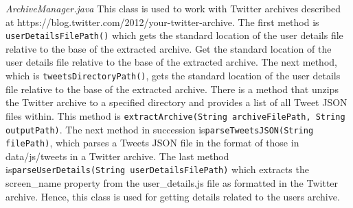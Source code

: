 \documentclass[a4paper, 12pt]{article}
\begin{document}
\begin{adjustwidth}{2em}{0pt}
\begin{adjustwidth}{2em}{0pt}
\noindent  \textit{ArchiveManager.java}  \newline
This class is used to work with Twitter archives described at https://blog.twitter.com/2012/your-twitter-archive. The first method is \texttt{userDetailsFilePath()} which gets the standard location of the user details file relative to the base of the extracted archive. Get the standard location of the user details file relative to the base of the extracted archive. The next method, which is \texttt{tweetsDirectoryPath()},  gets the standard location of the user details file relative to the base of the extracted archive. There is a method that unzips the Twitter archive to a specified directory and provides a list of all Tweet JSON files within. This method is \texttt{extractArchive(String archiveFilePath, String outputPath)}. The next method in succession is\newline \texttt{parseTweetsJSON(String filePath)}, which parses a Tweets JSON file in the format of those in data/js/tweets in a Twitter archive. The last method is\newline \texttt{parseUserDetails(String userDetailsFilePath)} which extracts the screen\_name property from the user\_details.js file as formatted in the Twitter archive. Hence, this class is used for getting details related to the users archive. \newline\newline



\end{adjustwidth}
\end{adjustwidth}
\end{document}
